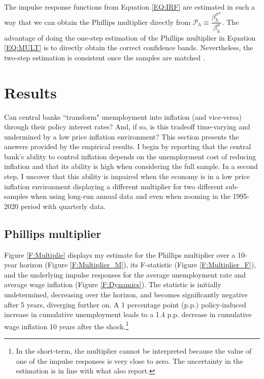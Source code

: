 \documentclass[12pt]{article}
\begin{document}
The impulse response functions from Equation \eqref{EQ:IRF} are estimated in such a way that we can obtain the Phillips multiplier directly from $\mathcal{P}_h \equiv \dfrac{\beta_h^{\pi^w}}{\beta_h^{u}}$. The advantage of doing the one-step estimation of the Phillips multiplier in Equation \eqref{EQ:MULT} is to directly obtain the correct confidence bands. Nevertheless, the two-step estimation is consistent once the samples are matched \citep{Ramey2018}.


\section{Results \label{S_Results}}

Can central banks ``transform" unemployment into inflation (and vice-versa) through their policy interest rates? And, if so, is this tradeoff time-varying and undermined by a low price inflation environment? This section presents the answers provided by the empirical results. I begin by reporting that the central bank's ability to control inflation depends on the unemployment cost of reducing inflation and that its ability is high when considering the full sample. In a second step, I uncover that this ability is impaired when the economy is in a low price inflation environment displaying a different multiplier for two different sub-samples when using long-run annual data and even when zooming in the 1995-2020 period with quarterly data.

\subsection{Phillips multiplier}

Figure \ref{F:Multiplie} displays my estimate for the Phillips multiplier over a 10-year horizon (Figure \ref{F:Multiplier_M}), its F-statistic (Figure \ref{F:Multiplier_F}), and the underlying impulse responses for the average unemployment rate and average wage inflation (Figure \ref{F:Dynamics}). The statistic is initially undetermined, decreasing over the horizon, and becomes significantly negative after 5 years, diverging further on. A 1 percentage point (p.p.) policy-induced increase in cumulative unemployment leads to a 1.4 p.p. decrease in cumulative wage inflation 10 years after the shock.\footnote{In the short-term, the multiplier cannot be interpreted because the value of one of the impulse responses is very close to zero. The uncertainty in the estimation is in line with what \cite{Barnichon2019} also report.}
\end{document}

